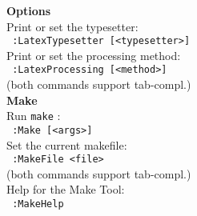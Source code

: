 \documentclass[oneside,10pt,landscape,DIV16]{scrartcl}
\begin{document}
\begin{multicols}{3}
\begin{center}
%
\parbox[t][130mm][t]{70mm}{
%
\large{\textbf{Options}}\\[1.0ex]
Print or set the typesetter: \\[1.0ex]
\texttt{ :LatexTypesetter [<typesetter>]} \\[1.0ex]
Print or set the processing method: \\[1.0ex]
\texttt{ :LatexProcessing [<method>]} \\[1.0ex]
(both commands support tab-compl.) \\[2.5ex]
%
\large{\textbf{Make}}\\[1.0ex]
Run \texttt{make} : \\[1.0ex]
\texttt{ :Make [<args>]} \\[1.0ex]
Set the current makefile: \\[1.0ex]
\texttt{ :MakeFile <file>} \\[1.0ex]
(both commands support tab-compl.) \\[1.0ex]
Help for the Make Tool: \\[1.0ex]
\texttt{ :MakeHelp} \\[2.5ex]
}
%
\end{center}%
\end{multicols}%
%
\end{document}
